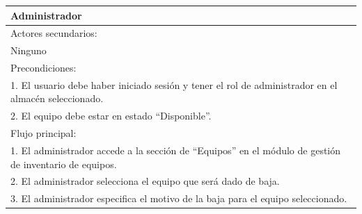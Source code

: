 \documentclass[stu, 12pt, letterpaper, donotrepeattitle, floatsintext, natbib]{apa7}
\begin{document}
\begin{longtable}{@{} p{16.5cm} @{}}
    Administrador                                                                                                                                                                                                                       \\ \midrule
    Actores secundarios:                                                                                                                                                                                                                \\
    Ninguno                                                                                                                                                                                                                             \\ \midrule
    Precondiciones:                                                                                                                                                                                                                     \\
    1. El usuario debe haber iniciado sesi\'on y tener el rol de administrador en el almac\'en seleccionado.                                                                                                                            \\
    2. El equipo debe estar en estado ``Disponible''.                                                                                                                                                                                   \\ \midrule
    Flujo principal:                                                                                                                                                                                                                    \\
    1. El administrador accede a la secci\'on de ``Equipos'' en el m\'odulo de gesti\'on de inventario de equipos.                                                                                                                      \\
    2. El administrador selecciona el equipo que ser\'a dado de baja.                                                                                                                                                                   \\
    3. El administrador especifica el motivo de la baja para el equipo seleccionado.                                                                                                                                                    \\

\end{longtable}
\end{document}
